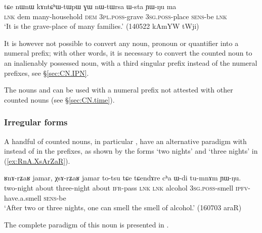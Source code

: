 \begin{exe}
\ex \label{ex:kAntChWtWpW}
\gll  tɕe nɯnɯ kɤntɕʰɯ-tɯpɯ ɣɯ nɯ-tɯrsa ɯ-sta ɲɯ-ŋu ma \\
 \textsc{lnk} dem many-household \textsc{dem} \textsc{3pl}.\textsc{poss}-grave \textsc{3sg}.\textsc{poss}-place \textsc{sens}-be \textsc{lnk} \\
\glt `It is the grave-place of many families.' (140522 kAmYW tWji)
\end{exe}

It is however not possible to convert any noun, pronoun or quantifier into a numeral prefix; with other words, it is necessary to convert the counted noun to an inalienably possessed noun, with a third singular  prefix instead of the numeral prefixes, see §\ref{sec:CN.IPN}.  

The nouns  and  can be used with a numeral prefix  not attested with other counted nouns (see §\ref{sec:CN.time}).

\subsubsection{Irregular forms} \label{sec:irregular.numeral.prefixes}
A handful of counted nouns, in particular , have an alternative paradigm with  instead of  in the prefixes, as shown by the forms  `two nights' and  `three nights' in (\ref{ex:RnA.XsArZaR}).

\begin{exe}
	\ex \label{ex:RnA.XsArZaR}
	\gll ʁnɤ-rʑaʁ jamar, χsɤ-rʑaʁ jamar to-tsu tɕe tɕendɤre cʰa ɯ-di tu-mnɤm ɲɯ-ŋu. \\
	two-night about three-night about \textsc{ifr}-pass \textsc{lnk} \textsc{lnk} alcohol \textsc{3sg}.\textsc{poss}-smell \textsc{ipfv}-have.a.smell \textsc{sens}-be \\
	\glt `After two or three nights, one can smell the smell of alcohol.' (160703 araR)
\end{exe}

The complete paradigm of this noun is presented in  
. 

